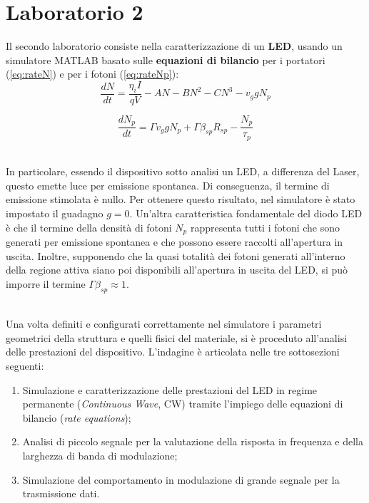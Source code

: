 \chapter{Laboratorio 2}
Il secondo laboratorio consiste nella caratterizzazione di un \textbf{LED}, usando un simulatore MATLAB basato sulle \textbf{equazioni di bilancio} per i portatori
(\ref{eq:rateN}) e per i fotoni (\ref{eq:rateNp}):
\begin{equation}\label{eq:rateN}
    \dfrac{dN}{dt} = \dfrac{\eta_i I}{qV} - AN - BN^2 - CN^3 - v_g g N_p
\end{equation}

\begin{equation}\label{eq:rateNp}
    \dfrac{dN_p}{dt} = \Gamma v_g g N_p + \Gamma \beta_{sp} R_{sp} - \dfrac{N_p}{\tau_p}
\end{equation}

\noindent\\ In particolare, essendo il dispositivo sotto analisi un LED, a differenza del Laser, questo emette luce per emissione spontanea. Di conseguenza, il termine di
emissione stimolata è nullo. Per ottenere questo risultato, nel simulatore è stato impostato il guadagno $g = 0$. Un'altra caratteristica fondamentale del diodo LED è che
il termine della densità di fotoni $N_p$ rappresenta tutti i fotoni che sono generati per emissione spontanea e che possono essere raccolti all'apertura in uscita. Inoltre,
supponendo che la quasi totalità dei fotoni generati all'interno della regione attiva siano poi disponibili all'apertura in uscita del LED, si può imporre il termine 
$\Gamma\beta_{sp} \approx 1$.

\noindent\\ Una volta definiti e configurati correttamente nel simulatore i parametri geometrici della struttura e quelli fisici del materiale, si è proceduto all'analisi delle
prestazioni del dispositivo. L'indagine è articolata nelle tre sottosezioni seguenti:
\begin{enumerate}
    \item Simulazione e caratterizzazione delle prestazioni del LED in regime permanente (\textit{Continuous Wave}, CW) tramite l'impiego delle equazioni
    di bilancio (\textit{rate equations});
    \item Analisi di piccolo segnale per la valutazione della risposta in frequenza e della larghezza di banda di modulazione;
    \item Simulazione del comportamento in modulazione di grande segnale per la trasmissione dati.
\end{enumerate}

